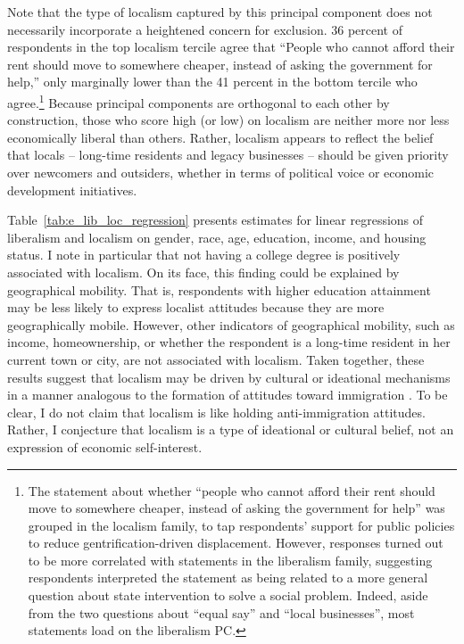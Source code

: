 \documentclass[article,11pt]{memoir}
\begin{document}
Note that the type of localism captured by this principal component does not necessarily incorporate a heightened concern for exclusion.  36 percent of respondents in the top localism tercile agree that ``People who cannot afford their rent should move to somewhere cheaper, instead of asking the government for help,'' only marginally lower than the 41 percent in the bottom tercile who agree.\footnote{The statement about whether ``people who cannot afford their rent should move to somewhere cheaper, instead of asking the government for help'' was grouped in the localism family, to tap respondents' support for public policies to reduce gentrification-driven displacement.  However, responses turned out to be more correlated with statements in the liberalism family, suggesting respondents interpreted the statement as being related to a more general question about state intervention to solve a social problem.  Indeed, aside from the two questions about ``equal say'' and ``local businesses'', most statements load on the liberalism PC.}  Because principal components are orthogonal to each other by construction, those who score high (or low) on localism are neither more nor less economically liberal than others. Rather, localism appears to reflect the belief that locals -- long-time residents and legacy businesses -- should be given priority over newcomers and outsiders, whether in terms of political voice or economic development initiatives.  

Table~\ref{tab:e_lib_loc_regression} presents estimates for linear regressions of liberalism and localism on gender, race, age, education, income, and housing status. I note in particular that not having a college degree is positively associated with localism.  On its face, this finding could be explained by geographical mobility.  That is, respondents with higher education attainment may be less likely to express localist attitudes because they are more geographically mobile.  However, other indicators of geographical mobility, such as income, homeownership, or whether the respondent is a long-time resident in her current town or city, are not associated with localism. Taken together, these results suggest that localism may be driven by cultural or ideational mechanisms in a manner analogous to the formation of attitudes toward immigration \citep[see e.g. the discussion in][]{hainmueller_public_2014}. To be clear, I do not claim that localism is like holding anti-immigration attitudes. Rather, I conjecture that localism is a type of ideational or cultural belief, not an expression of economic self-interest.
\end{document}
